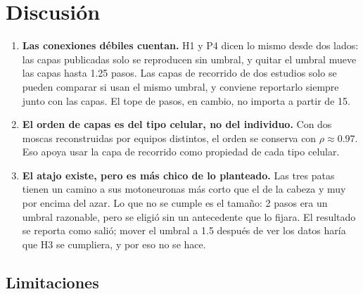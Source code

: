 \documentclass[11pt,letterpaper]{article}
\begin{document}
\section{Discusión}

\begin{enumerate}
  \item \textbf{Las conexiones débiles cuentan.} H1 y P4 dicen lo mismo desde dos lados: las capas publicadas solo se reproducen sin umbral, y quitar el umbral mueve las capas hasta 1.25 pasos. Las capas de recorrido de dos estudios solo se pueden comparar si usan el mismo umbral, y conviene reportarlo siempre junto con las capas. El tope de pasos, en cambio, no importa a partir de 15.
  \item \textbf{El orden de capas es del tipo celular, no del individuo.} Con dos moscas reconstruidas por equipos distintos, el orden se conserva con $\rho \approx 0.97$. Eso apoya usar la capa de recorrido como propiedad de cada tipo celular.
  \item \textbf{El atajo existe, pero es más chico de lo planteado.} Las tres patas tienen un camino a sus motoneuronas más corto que el de la cabeza y muy por encima del azar. Lo que no se cumple es el tamaño: 2 pasos era un umbral razonable, pero se eligió sin un antecedente que lo fijara. El resultado se reporta como salió; mover el umbral a 1.5 después de ver los datos haría que H3 se cumpliera, y por eso no se hace.
\end{enumerate}

\subsection{Limitaciones}
\end{document}
